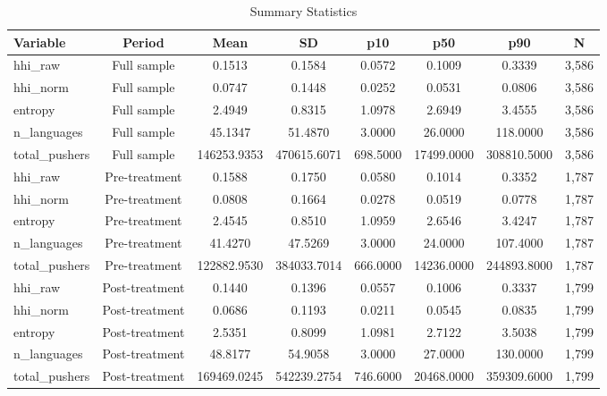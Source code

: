 \begin{table}[H]
\centering
\caption{Summary Statistics}
\label{tab:summary}
\small
\begin{tabular}{lccccccc}
\toprule
Variable & Period & Mean & SD & p10 & p50 & p90 & N \\
\midrule
hhi\_raw & Full sample & 0.1513 & 0.1584 & 0.0572 & 0.1009 & 0.3339 & 3,586 \\
hhi\_norm & Full sample & 0.0747 & 0.1448 & 0.0252 & 0.0531 & 0.0806 & 3,586 \\
entropy & Full sample & 2.4949 & 0.8315 & 1.0978 & 2.6949 & 3.4555 & 3,586 \\
n\_languages & Full sample & 45.1347 & 51.4870 & 3.0000 & 26.0000 & 118.0000 & 3,586 \\
total\_pushers & Full sample & 146253.9353 & 470615.6071 & 698.5000 & 17499.0000 & 308810.5000 & 3,586 \\
\midrule
hhi\_raw & Pre-treatment & 0.1588 & 0.1750 & 0.0580 & 0.1014 & 0.3352 & 1,787 \\
hhi\_norm & Pre-treatment & 0.0808 & 0.1664 & 0.0278 & 0.0519 & 0.0778 & 1,787 \\
entropy & Pre-treatment & 2.4545 & 0.8510 & 1.0959 & 2.6546 & 3.4247 & 1,787 \\
n\_languages & Pre-treatment & 41.4270 & 47.5269 & 3.0000 & 24.0000 & 107.4000 & 1,787 \\
total\_pushers & Pre-treatment & 122882.9530 & 384033.7014 & 666.0000 & 14236.0000 & 244893.8000 & 1,787 \\
\midrule
hhi\_raw & Post-treatment & 0.1440 & 0.1396 & 0.0557 & 0.1006 & 0.3337 & 1,799 \\
hhi\_norm & Post-treatment & 0.0686 & 0.1193 & 0.0211 & 0.0545 & 0.0835 & 1,799 \\
entropy & Post-treatment & 2.5351 & 0.8099 & 1.0981 & 2.7122 & 3.5038 & 1,799 \\
n\_languages & Post-treatment & 48.8177 & 54.9058 & 3.0000 & 27.0000 & 130.0000 & 1,799 \\
total\_pushers & Post-treatment & 169469.0245 & 542239.2754 & 746.6000 & 20468.0000 & 359309.6000 & 1,799 \\
\midrule
\bottomrule
\end{tabular}
\end{table}
